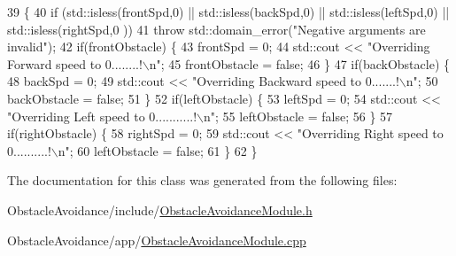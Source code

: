 \begin{DoxyCode}
39                                                                                              \{
40   \textcolor{keywordflow}{if} (std::isless(frontSpd,0) || std::isless(backSpd,0) || std::isless(leftSpd,0) || std::isless(rightSpd,0
      ))
41     \textcolor{keywordflow}{throw} std::domain\_error(\textcolor{stringliteral}{"Negative arguments are invalid"});
42   \textcolor{keywordflow}{if}(frontObstacle) \{
43     frontSpd = 0;
44     std::cout << \textcolor{stringliteral}{"Overriding Forward speed to 0........!\(\backslash\)n"};
45     frontObstacle = \textcolor{keyword}{false};      
46   \}
47   \textcolor{keywordflow}{if}(backObstacle) \{
48     backSpd = 0;
49     std::cout << \textcolor{stringliteral}{"Overriding Backward speed to 0.......!\(\backslash\)n"};
50     backObstacle = \textcolor{keyword}{false};       
51     \}
52   \textcolor{keywordflow}{if}(leftObstacle) \{
53     leftSpd = 0;
54     std::cout << \textcolor{stringliteral}{"Overriding Left speed to 0...........!\(\backslash\)n"};
55     leftObstacle = \textcolor{keyword}{false};
56   \}
57   \textcolor{keywordflow}{if}(rightObstacle) \{
58     rightSpd = 0;
59     std::cout << \textcolor{stringliteral}{"Overriding Right speed to 0..........!\(\backslash\)n"};
60     leftObstacle = \textcolor{keyword}{false};   
61   \}
62 \}
\end{DoxyCode}


The documentation for this class was generated from the following files\-:\begin{DoxyCompactItemize}
\item 
Obstacle\-Avoidance/include/\hyperlink{ObstacleAvoidanceModule_8h}{Obstacle\-Avoidance\-Module.\-h}\item 
Obstacle\-Avoidance/app/\hyperlink{ObstacleAvoidanceModule_8cpp}{Obstacle\-Avoidance\-Module.\-cpp}\end{DoxyCompactItemize}
